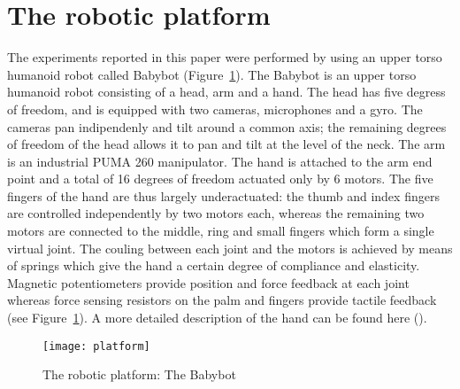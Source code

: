 \section{The robotic platform}
The experiments reported in this paper were performed by using an upper torso humanoid robot called Babybot (Figure~\ref{platform}). The Babybot is an upper torso humanoid robot consisting of a head, arm and a hand. The head has five degress of freedom, and is equipped with two cameras, microphones and a gyro. The cameras pan indipendenly and tilt around a common axis; the remaining degrees of freedom of the head allows it to pan and tilt at the level of the neck. The arm is an industrial PUMA 260 manipulator. The hand is attached to the arm end point and a total of 16 degrees of freedom actuated only by 6 motors. The five fingers of the hand are thus largely underactuated: the thumb and index fingers are controlled independently by two motors each, whereas the remaining two motors are connected to the middle, ring and small fingers which form a single virtual joint. The couling between each joint and the motors is achieved by means of springs which give the hand a certain degree of compliance and elasticity. Magnetic potentiometers provide position and force feedback at each joint whereas force sensing resistors on the palm and fingers provide tactile feedback (see Figure~\ref{platform}). A more detailed description of the hand can be found here (\cite{natale04thesis}).

\begin{figure}
\centering
\texttt{[image: platform]}
\caption{The robotic platform: The Babybot}
\label{platform}
\end{figure}
